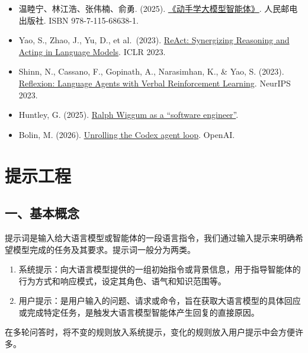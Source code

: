 \vspace{0.25em}
\begin{itemize}
\tightlist
\item
  温睦宁、林江浩、张伟楠、俞勇. (2025). \href{https://haa.boyuai.com/}{《动手学大模型智能体》}. 人民邮电出版社. ISBN 978-7-115-68638-1.
\item
  Yao, S., Zhao, J., Yu, D., et al.~(2023). \href{https://arxiv.org/abs/2210.03629}{ReAct: Synergizing Reasoning and Acting in Language Models}. ICLR 2023.
\item
  Shinn, N., Cassano, F., Gopinath, A., Narasimhan, K., \& Yao, S. (2023). \href{https://arxiv.org/abs/2303.11366}{Reflexion: Language Agents with Verbal Reinforcement Learning}. NeurIPS 2023.
\item
  Huntley, G. (2025). \href{https://ghuntley.com/ralph/}{Ralph Wiggum as a ``software engineer''}.
\item
  Bolin, M. (2026). \href{https://openai.com/index/unrolling-the-codex-agent-loop/}{Unrolling the Codex agent loop}. OpenAI.
\end{itemize}

\clearpage

\hypertarget{ux63d0ux793aux5de5ux7a0b}{%
\section{提示工程}\label{ux63d0ux793aux5de5ux7a0b}}

\hypertarget{ux4e00ux57faux672cux6982ux5ff5}{%
\subsection{一、基本概念}\label{ux4e00ux57faux672cux6982ux5ff5}}

提示词是输入给大语言模型或智能体的一段语言指令，我们通过输入提示来明确希望模型完成的任务及其要求。提示词一般分为两类。

\begin{enumerate}
\def\labelenumi{\arabic{enumi}.}
\item
  系统提示：向大语言模型提供的一组初始指令或背景信息，用于指导智能体的行为方式和响应模式，设定其角色、语气和知识范围等。
\item
  用户提示：是用户输入的问题、请求或命令，旨在获取大语言模型的具体回应或完成特定任务，是触发大语言模型智能体产生回复的直接原因。
\end{enumerate}

在多轮问答时，将不变的规则放入系统提示，变化的规则放入用户提示中会方便许多。

